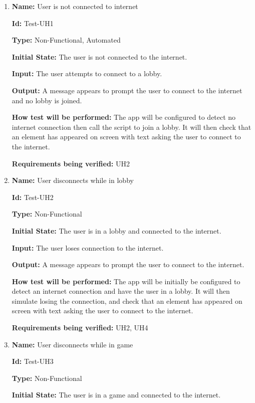 \documentclass[12pt, titlepage]{article}
\begin{document}
\begin{enumerate} 

\item{\textbf{Name:} User is not connected to internet} \label{itm:Test-UH1}

\textbf{Id:} Test-UH1

\textbf{Type:} Non-Functional, Automated
					
\textbf{Initial State:} The user is not connected to the internet. 
					
\textbf{Input:} The user attempts to connect to a lobby. 
					
\textbf{Output:} A message appears to prompt the user to connect to the internet and no lobby is joined.
					
\textbf{How test will be performed:} The app will be configured to detect no internet connection then call the script to join a lobby. It will then check that an element has appeared on screen with text asking the user to connect to the internet. 

\textbf{Requirements being verified:} UH2

\item{\textbf{Name:} User disconnects while in lobby} \label{itm:Test-UH2}

\textbf{Id:} Test-UH2

\textbf{Type:} Non-Functional
					
\textbf{Initial State:} The user is in a lobby and connected to the internet.
					
\textbf{Input:} The user loses connection to the internet.
					
\textbf{Output:} A message appears to prompt the user to connect to the internet. 
					
\textbf{How test will be performed:} The app will be initially be configured to detect an internet connection and have the user in a lobby. It will then simulate losing the connection, and check that an element has appeared on screen with text asking the user to connect to the internet. 

\textbf{Requirements being verified:} UH2, UH4

\item{\textbf{Name:} User disconnects while in game} \label{itm:Test-UH3}

\textbf{Id:} Test-UH3

\textbf{Type:} Non-Functional
					
\textbf{Initial State:} The user is in a game and connected to the internet.
					

\end{enumerate}
\end{document}
